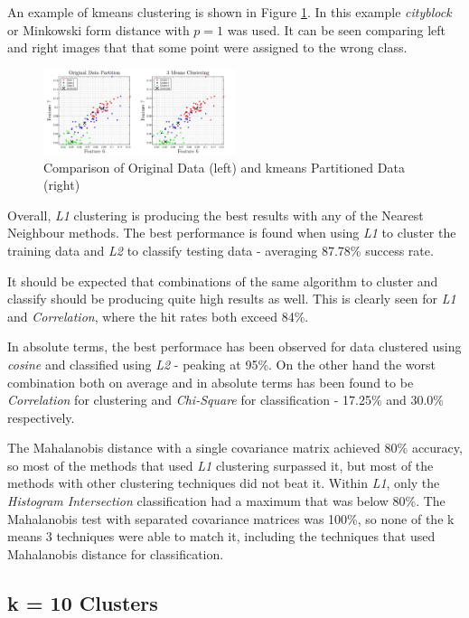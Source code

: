 \documentclass[10pt,twocolumn,letterpaper]{article}
\begin{document}
An example of kmeans clustering is shown in Figure \ref{fig:clusFig}. In this example \textit{cityblock} or Minkowski form distance with $p=1$ was used. It can be seen comparing left and right images that that some point were assigned to the wrong class.

\begin{figure}[H]
\centering
\includegraphics[width=0.5\textwidth]{../results/kmeans_part}
\caption{Comparison of Original Data (left) and kmeans Partitioned Data (right)
\label{fig:clusFig}}
\end{figure}
 
Overall, \textit{L1} clustering is producing the best results with any of the Nearest Neighbour methods. The best performance is found when using \textit{L1} to cluster the training data and \textit{L2} to classify testing data - averaging 87.78\% success rate.

It should be expected that combinations of the same algorithm to cluster and classify should be producing quite high results as well. This is clearly seen for \textit{L1} and \textit{Correlation}, where the hit rates both exceed 84\%.

In absolute terms, the best performace has been observed for data clustered using \textit{cosine} and classified using \textit{L2} - peaking at 95\%. On the other hand the worst combination both on average and in absolute terms has been found to be \textit{Correlation} for clustering and \textit{Chi-Square} for classification - 17.25\% and 30.0\% respectively.
 
The Mahalanobis distance with a single covariance matrix achieved 80\% accuracy, so most of the methods that used \textit{L1} clustering surpassed it, but most of the methods with other clustering techniques did not beat it. Within \textit{L1}, only the \textit{Histogram Intersection} classification had a maximum that was below 80\%. The Mahalanobis test with separated covariance matrices was 100\%, so none of the k means 3 techniques were able to match it, including the techniques that used Mahalanobis distance for classification.
 
\subsection{k = 10 Clusters}
\end{document}

